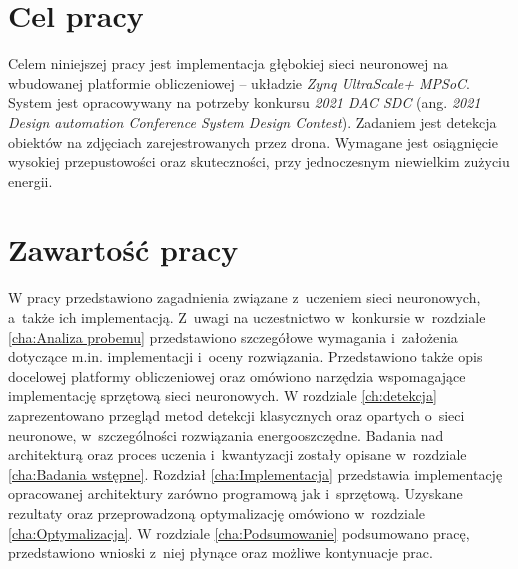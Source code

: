 \section{Cel pracy}
\label{sec:celePracy}
Celem niniejszej pracy jest implementacja głębokiej sieci neuronowej na wbudowanej platformie obliczeniowej -- układzie \emph{Zynq UltraScale+ MPSoC}.
System jest opracowywany na potrzeby konkursu \emph{2021 DAC SDC} (ang. \emph{ 2021 Design automation Conference System Design Contest}).
Zadaniem jest detekcja obiektów na zdjęciach zarejestrowanych przez drona. 
Wymagane jest osiągnięcie wysokiej przepustowości oraz skuteczności, przy jednoczesnym niewielkim zużyciu energii. 


\section{Zawartość pracy}
\label{sec:zawartoscPracy}
W pracy przedstawiono zagadnienia związane z~uczeniem sieci neuronowych, a~także ich implementacją. 
Z~uwagi na uczestnictwo w~konkursie w~rozdziale \ref{cha:Analiza probemu} przedstawiono szczegółowe wymagania i~założenia dotyczące m.in. implementacji i~oceny rozwiązania. 
Przedstawiono także opis docelowej platformy obliczeniowej oraz omówiono narzędzia wspomagające implementację sprzętową sieci neuronowych.
W rozdziale \ref{ch:detekcja} zaprezentowano przegląd metod detekcji klasycznych oraz opartych o~sieci neuronowe, w~szczególności rozwiązania energooszczędne.
Badania nad architekturą oraz proces uczenia i~kwantyzacji zostały opisane w~rozdziale \ref{cha:Badania wstępne}.
Rozdział \ref{cha:Implementacja} przedstawia implementację opracowanej architektury zarówno programową jak i~sprzętową. 
Uzyskane rezultaty oraz przeprowadzoną optymalizację omówiono w~rozdziale \ref{cha:Optymalizacja}. 
W rozdziale \ref{cha:Podsumowanie} podsumowano pracę, przedstawiono wnioski z~niej płynące
oraz możliwe kontynuacje prac. 

